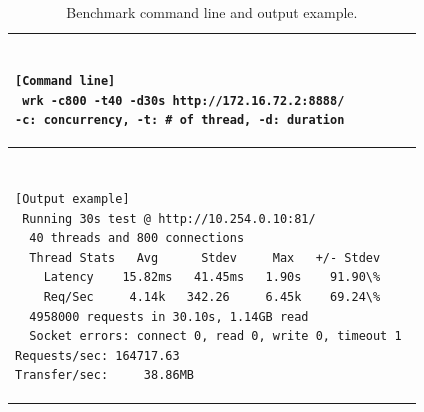 \begin{table}[h]
  \centering
  \begin{tabular}{l}
    \hline
    \begin{minipage}{0.8\columnwidth}
      \begin{verbatim}

[Command line] 
 wrk -c800 -t40 -d30s http://172.16.72.2:8888/ 
-c: concurrency, -t: # of thread, -d: duration 
      \end{verbatim}
    \end{minipage}
    \\ \hline

    \\ \hline
    \begin{minipage}{0.8\columnwidth}
      \begin{verbatim}

[Output example] 
 Running 30s test @ http://10.254.0.10:81/ 
  40 threads and 800 connections 
  Thread Stats   Avg      Stdev     Max   +/- Stdev 
    Latency    15.82ms   41.45ms   1.90s    91.90\% 
    Req/Sec     4.14k   342.26     6.45k    69.24\% 
  4958000 requests in 30.10s, 1.14GB read 
  Socket errors: connect 0, read 0, write 0, timeout 1 
Requests/sec: 164717.63 
Transfer/sec:     38.86MB 
      \end{verbatim}
    \end{minipage}
    \\ \hline
  \end{tabular}
  \caption[Benchmark command line and output example]{Benchmark command line and output example.}
  \label{tab:bench_example}
\end{table}

